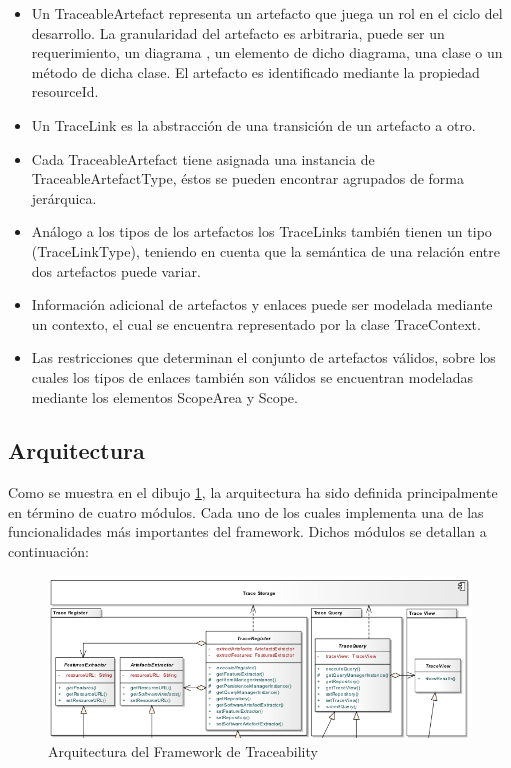 \documentclass[a4paper,12pt,twoside,spanish,openright]{book}
\begin{document}
\begin{itemize}
\item Un \textsf{TraceableArtefact} representa un artefacto que juega un rol en el ciclo del desarrollo. La granularidad del artefacto es arbitraria, puede ser un requerimiento, un diagrama , un elemento de dicho diagrama, una clase o un método de dicha clase. El artefacto es identificado mediante la propiedad \textsf{resourceId}.
\item Un \textsf{TraceLink} es la abstracción de una transición de un artefacto a otro.
\item Cada \textsf{TraceableArtefact} tiene asignada una instancia de \textsf{TraceableArtefactType}, éstos se pueden encontrar agrupados de forma jerárquica.
 \item Análogo a los tipos de los artefactos los \textsf{TraceLinks} también tienen un tipo (\textsf{TraceLinkType}), teniendo en cuenta que la semántica de una relación entre dos artefactos puede variar.
\item Información adicional de artefactos y enlaces puede ser modelada mediante un contexto, el cual se encuentra representado por la clase \textsf{TraceContext}.
\item Las restricciones que determinan el conjunto de artefactos válidos, sobre los cuales los tipos de enlaces también son válidos se encuentran modeladas mediante los elementos \textsf{ScopeArea} y \textsf{Scope}.
\end{itemize}

\subsection{Arquitectura}

Como se muestra en el dibujo \ref{fig:SPLArquitectura}, la arquitectura ha sido definida principalmente en término de cuatro módulos. Cada uno de los cuales implementa una de las funcionalidades más importantes del framework. Dichos módulos se detallan a continuación:

\begin{figure}[hbtp]
\centering
\includegraphics[scale=.55]{./img/ArquitecturaTraceabilityFramework}
\caption{Arquitectura del Framework de Traceability}
\label{fig:SPLArquitectura}
\end{figure}
\end{document}
